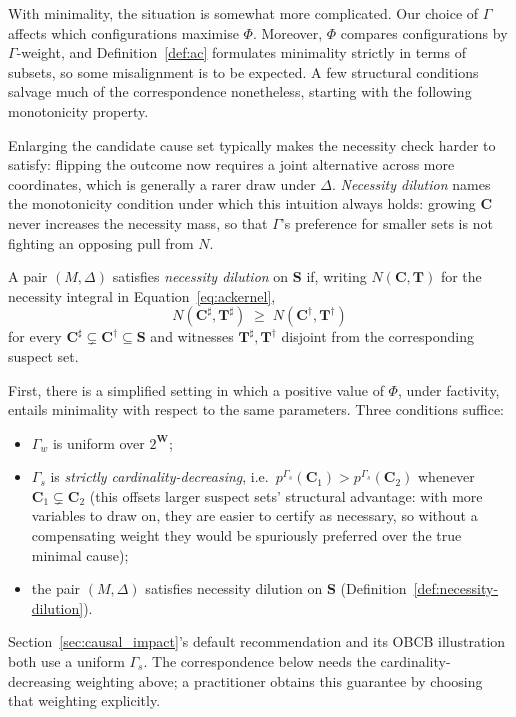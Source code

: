 \medskip
With minimality, the situation is somewhat more complicated. Our choice of $\Gamma$
affects which configurations maximise $\Phi$. Moreover, $\Phi$ compares
configurations by $\Gamma$-weight, and Definition~\ref{def:ac} formulates minimality
strictly in terms of subsets, so some misalignment is to be expected. A few structural conditions salvage much of the
correspondence nonetheless, starting with the following monotonicity property.

Enlarging the candidate cause set typically makes the necessity check harder to
satisfy: flipping the outcome now requires a joint alternative across more
coordinates, which is generally a rarer draw under $\Delta$. \emph{Necessity
dilution} names the monotonicity condition under which this intuition always
holds: growing $\mathbf{C}$ never increases the necessity mass, so that
$\Gamma$'s preference for smaller sets is not fighting an opposing pull from $N$.

\begin{definition}\label{def:necessity-dilution}
A pair $(M,\Delta)$ satisfies \emph{necessity dilution} on $\mathbf{S}$ if, writing
$N(\mathbf{C},\mathbf{T})$ for the necessity integral in
Equation~\eqref{eq:ackernel},
\[
N(\mathbf{C}^\sharp,\mathbf{T}^\sharp)\;\geq\;N(\mathbf{C}^\dagger,\mathbf{T}^\dagger)
\]
for every $\mathbf{C}^\sharp\subsetneq\mathbf{C}^\dagger\subseteq\mathbf{S}$ and
witnesses $\mathbf{T}^\sharp,\mathbf{T}^\dagger$ disjoint from the corresponding
suspect set.
\end{definition}

First, there is a simplified setting in which a positive value of $\Phi$,
under factivity, entails minimality with respect to the same parameters. Three
conditions suffice:
\begin{itemize}
\item $\Gamma_w$ is uniform over $2^{\mathbf{W}}$;
\item $\Gamma_s$ is \emph{strictly cardinality-decreasing}, i.e.\
$p^{\Gamma_s}(\mathbf{C}_1) > p^{\Gamma_s}(\mathbf{C}_2)$ whenever
$\mathbf{C}_1\subsetneq\mathbf{C}_2$ (this offsets larger suspect sets' structural
advantage: with more variables to draw on, they are easier to certify as necessary,
so without a compensating weight they would be spuriously preferred over the true
minimal cause);
\item the pair $(M,\Delta)$ satisfies necessity dilution on $\mathbf{S}$
(Definition~\ref{def:necessity-dilution}).
\end{itemize}
Section~\ref{sec:causal_impact}'s default recommendation and its OBCB illustration
both use a uniform $\Gamma_s$. The correspondence below needs the
cardinality-decreasing weighting above; a practitioner obtains this guarantee by
choosing that weighting explicitly.

